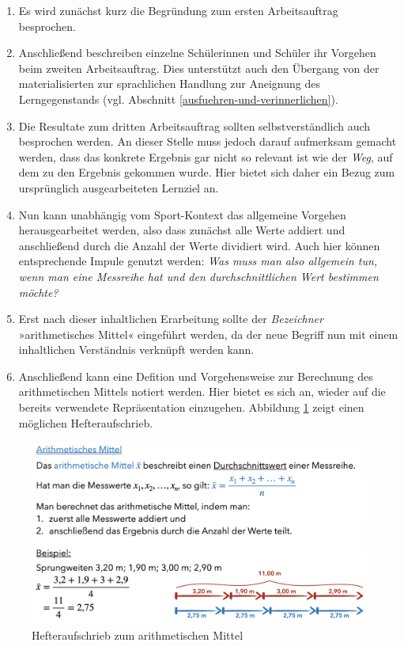 \documentclass[
]{scrbook}
\providecommand{\tightlist}{%
  \setlength{\itemsep}{0pt}\setlength{\parskip}{0pt}}
\theoremstyle{definition}
\theoremstyle{definition}
\theoremstyle{definition}
\theoremstyle{definition}
\theoremstyle{remark}
\begin{document}
\begin{enumerate}
\def\labelenumi{\arabic{enumi}.}
\tightlist
\item
  Es wird zunächst kurz die Begründung zum ersten Arbeitsauftrag besprochen.
\item
  Anschließend beschreiben einzelne Schülerinnen und Schüler ihr Vorgehen beim zweiten Arbeitsauftrag. Dies unterstützt auch den Übergang von der materialisierten zur sprachlichen Handlung zur Aneignung des Lerngegenstands (vgl. Abschnitt \ref{ausfuehren-und-verinnerlichen}).
\item
  Die Resultate zum dritten Arbeitsauftrag sollten selbstverständlich auch besprochen werden. An dieser Stelle muss jedoch darauf aufmerksam gemacht werden, dass das konkrete Ergebnis gar nicht so relevant ist wie der \emph{Weg}, auf dem zu den Ergebnis gekommen wurde. Hier bietet sich daher ein Bezug zum ursprünglich ausgearbeiteten Lernziel an.
\item
  Nun kann unabhängig vom Sport-Kontext das allgemeine Vorgehen herausgearbeitet werden, also dass zunächst alle Werte addiert und anschließend durch die Anzahl der Werte dividiert wird. Auch hier können entsprechende Impule genutzt werden: \emph{Was muss man also allgemein tun, wenn man eine Messreihe hat und den durchschnittlichen Wert bestimmen möchte?}
\item
  Erst nach dieser inhaltlichen Erarbeitung sollte der \emph{Bezeichner} »arithmetisches Mittel« eingeführt werden, da der neue Begriff nun mit einem inhaltlichen Verständnis verknüpft werden kann.
\item
  Anschließend kann eine Defition und Vorgehensweise zur Berechnung des arithmetischen Mittels notiert werden. Hier bietet es sich an, wieder auf die bereits verwendete Repräsentation einzugehen. Abbildung \ref{fig:Hefter} zeigt einen möglichen Hefteraufschrieb.
\end{enumerate}

\begin{figure}

{\centering \includegraphics[width=0.9\linewidth]{pictures/B-Hefter} 

}

\caption{Hefteraufschrieb zum arithmetischen Mittel}\label{fig:Hefter}
\end{figure}
\end{document}
